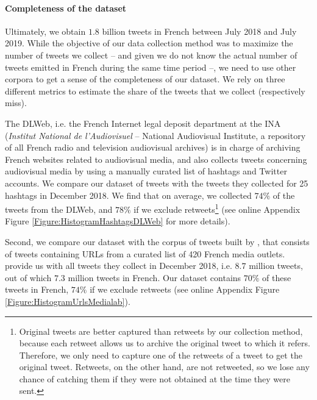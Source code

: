 \paragraph{Completeness of the dataset}

Ultimately, we obtain $1.8$ billion tweets in French between July 2018 and July 2019. While the objective of our data collection method was to maximize the number of tweets we collect -- and given we do not know the actual number of tweets emitted in French during the same time period --, we need to use other corpora to get a sense of the completeness of our dataset. We rely on three different metrics to estimate the share of the tweets that we collect (respectively miss).

The DLWeb, i.e. the French Internet legal deposit department at the INA (\textit{Institut National de l'Audiovisuel} -- National Audiovisual Institute, a repository of all French radio and television audiovisual archives) is in charge of archiving French websites related to audiovisual media, and also collects tweets concerning audiovisual media by using a manually curated list of hashtags and Twitter accounts. We compare our dataset of tweets with the tweets they collected for 25 hashtags in December 2018. We find that on average, we collected $74\%$ of the tweets from the DLWeb, and $78\%$ if we exclude retweets\footnote{Original tweets are better captured than retweets by our collection method, because each retweet allows us to archive the original tweet to which it refers. Therefore, we only need to capture one of the retweets of a tweet to get the original tweet. Retweets, on the other hand, are not retweeted, so we lose any chance of catching them if they were not obtained at the time they were sent.} (see online Appendix Figure \ref{Figure:HistogramHashtagsDLWeb} for more details).

Second, we compare our dataset with the corpus of tweets built by \citet{cardon2019unfolding}, that consists of tweets containing URLs from a curated list of 420 French media outlets. \citet{cardon2019unfolding} provide us with all tweets they collect in December 2018, i.e. $8.7$ million tweets, out of which $7.3$ million tweets in French. Our dataset contains $70\%$ of these tweets in French, $74\%$ if we exclude retweets (see online Appendix Figure \ref{Figure:HistogramUrlsMedialab}).

